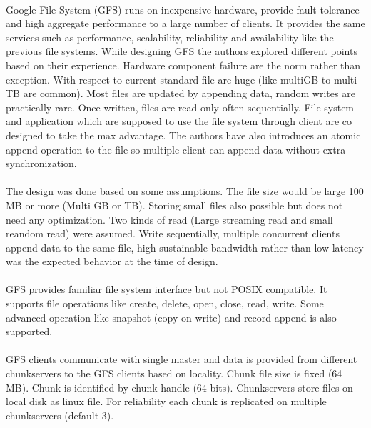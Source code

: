 \documentclass[8pt]{extarticle}
\begin{document}
	\paragraph{}
	Google File System (GFS) runs on inexpensive hardware, provide fault tolerance and high aggregate performance to a large number of clients. It provides the same services such as performance, scalability, reliability and availability like the previous file systems. While designing GFS the authors  explored different points based on their experience. Hardware component failure are the norm rather than exception. With respect to current standard file are huge (like multiGB to multi TB are common). Most files are updated by appending data, random writes are practically rare. Once written, files are read only often sequentially. File system and application which are supposed to use the file system through client are co designed to take the max advantage. The authors have also introduces an atomic append operation to the file so multiple client can append data without extra synchronization.
	
	\paragraph{}
	The design was done based on some assumptions. The file size would be large 100 MB or more (Multi GB or TB). Storing small files also possible but does not need any optimization. Two kinds of read (Large streaming read and small reandom read) were assumed. Write sequentially, multiple concurrent clients append data to the same file, high sustainable bandwidth rather than low latency was the expected behavior at the time of design.
	
	\paragraph{}
	GFS provides familiar file system interface but not POSIX compatible. It supports file operations like create, delete, open, close, read, write. Some advanced operation like snapshot (copy on write) and record append is also supported.
	
	\paragraph{}
	GFS clients communicate with single master and data is provided from different chunkservers to the GFS clients based on locality. Chunk file size is fixed (64 MB). Chunk is identified by chunk handle (64 bits). Chunkservers store files on local disk as linux file. For reliability each chunk is replicated on multiple chunkservers (default 3).
	
\end{document}
